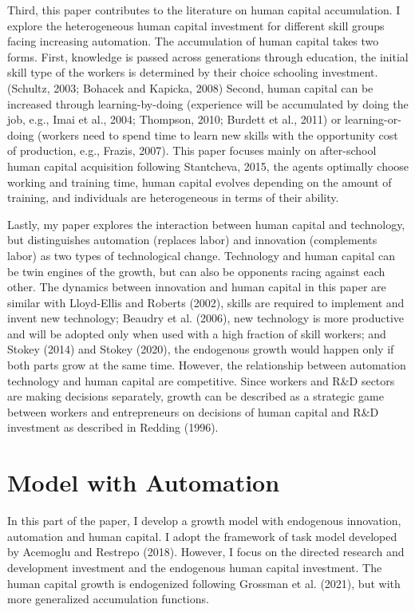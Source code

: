 \documentclass[12pt]{article}
\begin{document}
Third, this paper contributes to the literature on human capital accumulation. I explore the heterogeneous human capital investment for different skill groups facing increasing automation. The accumulation of human capital takes two forms. First, knowledge is passed across generations through education, the initial skill type of the workers is determined by their choice schooling investment. (Schultz, 2003\nocite{Schultz2003}; Bohacek and Kapicka, 2008\nocite{BohacekKapicka2008}) Second, human capital can be increased through learning-by-doing (experience will be accumulated by doing the job, e.g., Imai et al., 2004\nocite{Imaietal2004}; Thompson, 2010\nocite{Thompson2010}; Burdett et al., 2011\nocite{Burdettetal2011}) or learning-or-doing (workers need to spend time to learn new skills with the opportunity cost of production, e.g., Frazis, 2007\nocite{Frazis2007}). This paper focuses mainly on after-school human capital acquisition following Stantcheva, 2015\nocite{Stantcheva2015}, the agents optimally choose working and training time, human capital evolves depending on the amount of training, and individuals are heterogeneous in terms of their ability. 

Lastly, my paper explores the interaction between human capital and technology, but distinguishes automation (replaces labor) and innovation (complements labor) as two types of technological change. Technology and human capital can be twin engines of the growth, but can also be opponents racing against each other. The dynamics between innovation and human capital in this paper are similar with Lloyd-Ellis and Roberts (2002)\nocite{Lloyd-EllisRoberts2002}, skills are required to implement and invent new technology; Beaudry et al. (2006)\nocite{Beaudryetal2006}, new technology is more productive and will be adopted only when used with a high fraction of skill workers; and Stokey (2014)\nocite{Stokey2014} and Stokey (2020)\nocite{Stokey2020}, the endogenous growth would happen only if both parts grow at the same time. However, the relationship between automation technology and human capital are competitive. Since workers and R\&D sectors are making decisions separately, growth can be described as a strategic game between workers and entrepreneurs on decisions of human capital and R\&D investment as described in Redding (1996)\nocite{Redding1996}.


\section{Model with Automation}
In this part of the paper, I develop a growth model with endogenous innovation, automation and human capital. I adopt the framework of task model developed by Acemoglu and Restrepo (2018)\nocite{AcemogluRestrepo2018}. However, I focus on the directed research and development investment and the endogenous human capital investment. The human capital growth is endogenized following Grossman et al. (2021)\nocite{Grossmanetal2021}, but with more generalized accumulation functions. 
\end{document}
